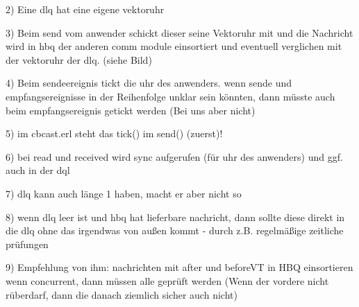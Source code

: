 2) Eine dlq hat eine eigene vektoruhr

3) Beim send vom anwender schickt dieser seine Vektoruhr mit und die Nachricht wird in hbq der anderen comm  module einsortiert und eventuell verglichen mit der vektoruhr der dlq. (siehe Bild) 

4) Beim sendeereignis tickt die uhr des anwenders.
wenn sende und empfangsereignisse in der Reihenfolge unklar sein könnten, dann müsste auch beim empfangsereignis getickt werden (Bei uns aber nicht)

5) im cbcast.erl steht das tick() im send() (zuerst)!

6) bei read und received wird sync aufgerufen (für uhr des anwenders) und ggf. auch in der dql

7) dlq kann auch länge 1 haben, macht er aber nicht so

8) wenn dlq leer ist und hbq hat lieferbare nachricht, dann sollte diese direkt in die dlq ohne das irgendwas von außen kommt - durch z.B. regelmäßige zeitliche prüfungen

9) Empfehlung von ihm: nachrichten mit after und beforeVT in HBQ einsortieren
wenn concurrent, dann müssen alle geprüft werden (Wenn der vordere nicht rüberdarf, dann die danach ziemlich sicher auch nicht)
